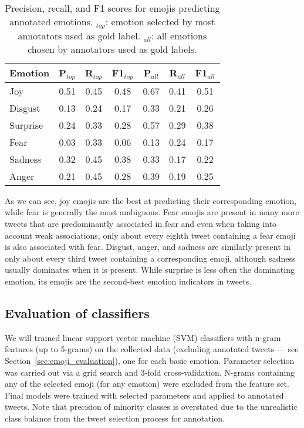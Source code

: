 \documentclass[10pt, a4paper]{article}
\begin{document}
\begin{table}[!ht]
\centering
\begin{tabular}{l | c | c | c | c | c | c}
\textbf{Emotion} & \textbf{P$_{top}$} & \textbf{R$_{top}$} & \textbf{F1$_{top}$} & \textbf{P$_{all}$} & \textbf{R$_{all}$} & \textbf{F1$_{all}$} \\\hline
Joy & 0.51 & 0.45 & 0.48 & 0.67 & 0.41 & 0.51 \\
Disgust & 0.13 & 0.24 & 0.17 & 0.33 & 0.21 & 0.26 \\
Surprise & 0.24 & 0.33 & 0.28 & 0.57 & 0.29 & 0.38 \\
Fear & 0.03 & 0.33 & 0.06 & 0.13 & 0.24 & 0.17 \\
Sadness & 0.32 & 0.45 & 0.38 & 0.33 & 0.17 & 0.22 \\
Anger & 0.21 & 0.45 & 0.28 & 0.39 & 0.19 & 0.25
\end{tabular}
\caption{Precision, recall, and F1 scores for emojis predicting annotated emotions. $_{top}$: emotion selected by most annotators used as gold label. $_{all}$: all emotions chosen by annotators used as gold labels.}
\label{tab:precision_emojis}
\end{table}

As we can see, joy emojis are the best at predicting their corresponding emotion, while fear is generally the most ambiguous. Fear emojis are present in many more tweets that are predominantly associated in fear and even when taking into account weak associations, only about every eighth tweet containing a fear emoji is also associated with fear. Disgust, anger, and sadness are similarly present in only about every third tweet containing a corresponding emoji, although sadness usually dominates when it is present. While surprise is less often the dominating emotion, its emojis are the second-best emotion indicators in tweets.

\subsection{Evaluation of classifiers}
\label{sec:classifier_evaluation}
We will trained linear support vector machine (SVM) classifiers with n-gram features (up to 5-grams) on the collected data (excluding annotated tweets --- see Section~\ref{sec:emoji_evaluation}), one for each basic emotion. 
Parameter selection was carried out via a grid search and 3-fold cross-validation.
N-grams containing any of the selected emoji (for any emotion) were excluded from the feature set.
Final models were trained with selected parameters and applied to annotated tweets. 
Note that precision of minority classes is overstated due to the unrealistic class balance from the tweet selection process for annotation.
\end{document}
